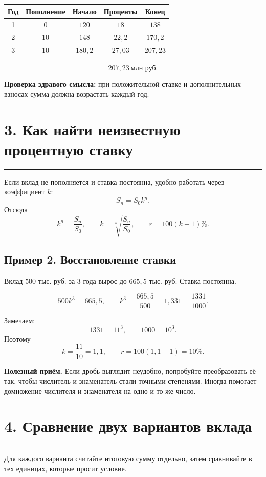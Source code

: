\documentclass[a4paper,12pt]{article}
\newcommand{\sectionline}{\vspace{-0.4em}\textcolor{linegray}{\rule{\linewidth}{0.5pt}}\vspace{0.35em}}
\newcommand{\key}[1]{\textcolor{darkaccent}{\textbf{#1}}}
\begin{document}
\begin{center}
\begin{tabular}{ccccc}
\toprule
Год & Пополнение & Начало & Проценты & Конец \\
\midrule
1 & $0$ & $120$ & $18$ & $138$ \\
2 & $10$ & $148$ & $22{,}2$ & $170{,}2$ \\
3 & $10$ & $180{,}2$ & $27{,}03$ & $207{,}23$ \\
\bottomrule
\end{tabular}
\end{center}

\[
\boxed{207{,}23\ \text{млн руб.}}
\]

\key{Проверка здравого смысла:} при положительной ставке и дополнительных взносах сумма должна возрастать каждый год.

\clearpage

\section*{3. Как найти неизвестную процентную ставку}
\sectionline

Если вклад не пополняется и ставка постоянна, удобно работать через коэффициент $k$:
\[
S_n=S_0k^n.
\]
Отсюда
\[
k^n=\frac{S_n}{S_0},\qquad
k=\sqrt[n]{\frac{S_n}{S_0}},\qquad
r=100(k-1)\%.
\]

\subsection*{Пример 2. Восстановление ставки}
Вклад $500$ тыс. руб. за $3$ года вырос до $665{,}5$ тыс. руб. Ставка постоянна.

\[
500k^3=665{,}5,
\qquad
k^3=\frac{665{,}5}{500}=1{,}331=\frac{1331}{1000}.
\]

Замечаем:
\[
1331=11^3,\qquad 1000=10^3.
\]
Поэтому
\[
k=\frac{11}{10}=1{,}1,
\qquad
r=100(1{,}1-1)=10\%.
\]

\key{Полезный приём.} Если дробь выглядит неудобно, попробуйте преобразовать её так, чтобы числитель и знаменатель стали точными степенями. Иногда помогает домножение числителя и знаменателя на одно и то же число.

\section*{4. Сравнение двух вариантов вклада}
\sectionline

Для каждого варианта считайте итоговую сумму отдельно, затем сравнивайте в тех единицах, которые просит условие.
\end{document}
